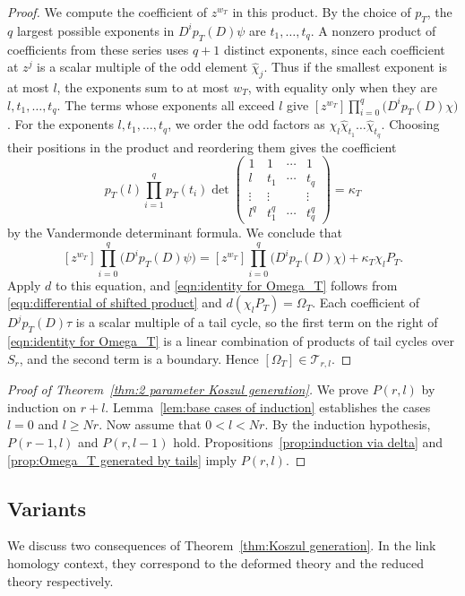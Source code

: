 \documentclass[reqno]{amsart}
\theoremstyle{definition}
\theoremstyle{remark}
\newcommand{\cat}{\mathcal{T}}
\newcommand{\whc}{\widehat{\chi}}
\begin{document}
\begin{proof}
We compute the coefficient of $z^{w_T}$ in this product. By the choice of $p_T$, the $q$ largest possible exponents in $D^ip_T(D)\psi$ are $t_1,\dots,t_q$. A nonzero product of coefficients from these series uses $q+1$ distinct exponents, since each coefficient at $z^j$ is a scalar multiple of the odd element $\whc_j$. Thus if the smallest exponent is at most $l$, the exponents sum to at most $w_T$, with equality only when they are $l,t_1,\dots,t_q$. The terms whose exponents all exceed $l$ give $[z^{w_T}]\prod_{i=0}^q\bigl(D^ip_T(D)\chi\bigr)$. For the exponents $l,t_1,\dots,t_q$, we order the odd factors as $\chi_l\whc_{t_1}\dots\whc_{t_q}$. Choosing their positions in the product and reordering them gives the coefficient \[p_T(l)\prod_{i=1}^qp_T(t_i)\det\begin{pmatrix}
1&1&\cdots&1\\
l&t_1&\cdots&t_q\\
\vdots&\vdots&&\vdots\\
l^q&t_1^q&\cdots&t_q^q
\end{pmatrix}=\kappa_T\] by the Vandermonde determinant formula. We conclude that \[[z^{w_T}]\prod_{i=0}^q\bigl(D^ip_T(D)\psi\bigr)=[z^{w_T}]\prod_{i=0}^q\bigl(D^ip_T(D)\chi\bigr)+\kappa_T\chi_lP_T.\] Apply $d$ to this equation, and \eqref{eqn:identity for Omega_T} follows from \eqref{eqn:differential of shifted product} and $d(\chi_lP_T)=\Omega_T$. Each coefficient of $D^jp_T(D)\tau$ is a scalar multiple of a tail cycle, so the first term on the right of \eqref{eqn:identity for Omega_T} is a linear combination of products of tail cycles over $S_r$, and the second term is a boundary. Hence $[\Omega_T]\in\cat_{r,l}$.
\end{proof}

\begin{proof}[Proof of Theorem~\ref{thm:2 parameter Koszul generation}]
We prove $P(r,l)$ by induction on $r+l$. Lemma~\ref{lem:base cases of induction} establishes the cases $l=0$ and $l\ge Nr$. Now assume that $0<l<Nr$. By the induction hypothesis, $P(r-1,l)$ and $P(r,l-1)$ hold. Propositions~\ref{prop:induction via delta} and \ref{prop:Omega_T generated by tails} imply $P(r,l)$.
\end{proof}


\subsection{Variants}\label{sec:variants}

We discuss two consequences of Theorem~\ref{thm:Koszul generation}. In the link homology context, they correspond to the deformed theory and the reduced theory respectively.
\end{document}
